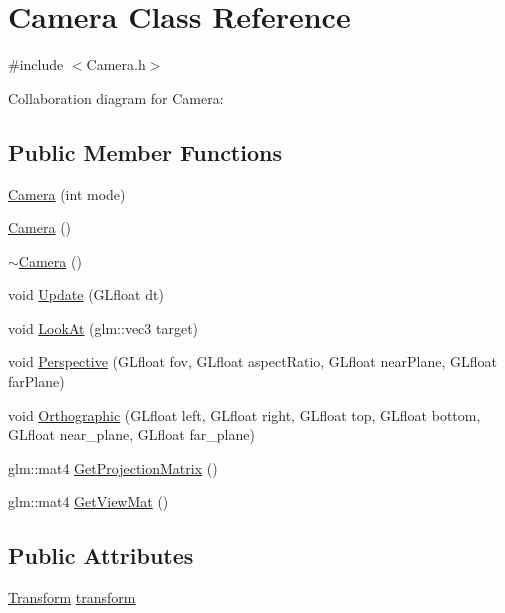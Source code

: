 \hypertarget{class_camera}{}\section{Camera Class Reference}
\label{class_camera}


{\ttfamily \#include $<$Camera.\+h$>$}



Collaboration diagram for Camera\+:
\subsection*{Public Member Functions}
\begin{DoxyCompactItemize}
\item 
\mbox{\hyperlink{class_camera_a706e41a11eee92cd3f597386ae860885}{Camera}} (int mode)
\item 
\mbox{\hyperlink{class_camera_a01f94c3543f56ede7af49dc778f19331}{Camera}} ()
\item 
\mbox{\hyperlink{class_camera_ad1897942d0ccf91052386388a497349f}{$\sim$\+Camera}} ()
\item 
void \mbox{\hyperlink{class_camera_ac8e78ac212afde90f72d59b3795474d0}{Update}} (G\+Lfloat dt)
\item 
void \mbox{\hyperlink{class_camera_a657181de0da2b330865d005a3e08cc9f}{Look\+At}} (glm\+::vec3 target)
\item 
void \mbox{\hyperlink{class_camera_a61d3c3da4bab7c69c7f24c3f37abe1e5}{Perspective}} (G\+Lfloat fov, G\+Lfloat aspect\+Ratio, G\+Lfloat near\+Plane, G\+Lfloat far\+Plane)
\item 
void \mbox{\hyperlink{class_camera_ad434a557e137d9c24369a3737f857736}{Orthographic}} (G\+Lfloat left, G\+Lfloat right, G\+Lfloat top, G\+Lfloat bottom, G\+Lfloat near\+\_\+plane, G\+Lfloat far\+\_\+plane)
\item 
glm\+::mat4 \mbox{\hyperlink{class_camera_ab0a4bf5a65d45f25529e3cffda1c361b}{Get\+Projection\+Matrix}} ()
\item 
glm\+::mat4 \mbox{\hyperlink{class_camera_a06b3f8e75270f4f2415f8591a315f231}{Get\+View\+Mat}} ()
\end{DoxyCompactItemize}
\subsection*{Public Attributes}
\begin{DoxyCompactItemize}
\item 
\mbox{\hyperlink{class_transform}{Transform}} \mbox{\hyperlink{class_camera_ad5cea63239e1519c1fe7d414f5e047a8}{transform}}
\end{DoxyCompactItemize}
